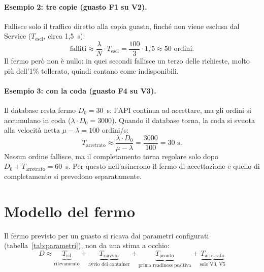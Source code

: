 \paragraph{Esempio 2: tre copie (guasto F1 su V2).} Fallisce solo il traffico diretto alla copia guasta, finché non viene esclusa dal Service ($T_{\text{escl}}$, circa 1,5~s):
\[
\text{falliti} \approx \frac{\lambda}{N} \cdot T_{\text{escl}} = \frac{100}{3} \cdot 1{,}5 \approx 50 \text{ ordini.}
\]
Il fermo però non è nullo: in quei secondi fallisce un terzo delle richieste, molto più dell'1\% tollerato, quindi contano come indisponibili.

\paragraph{Esempio 3: con la coda (guasto F4 su V3).} Il database resta fermo $D_0 = 30$~s: l'API continua ad accettare, ma gli ordini si accumulano in coda ($\lambda \cdot D_0 = 3000$). Quando il database torna, la coda si svuota alla velocità netta $\mu - \lambda = 100$ ordini/s:
\[
T_{\text{arretrato}} \approx \frac{\lambda \cdot D_0}{\mu - \lambda} = \frac{3000}{100} = 30 \text{ s.}
\]
Nessun ordine fallisce, ma il completamento torna regolare solo dopo $D_0 + T_{\text{arretrato}} = 60$~s. Per questo nell'asincrono il fermo di accettazione e quello di completamento si prevedono separatamente.

\section{Modello del fermo}

Il fermo previsto per un guasto si ricava dai parametri configurati (tabella~\ref{tab:parametri}), non da una stima a occhio:
\begin{equation}
  D \approx \underbrace{T_{\text{ril}}}_{\text{rilevamento}} + \underbrace{T_{\text{riavvio}}}_{\text{avvio del container}} + \underbrace{T_{\text{pronto}}}_{\text{prima readiness positiva}} + \underbrace{T_{\text{arretrato}}}_{\text{solo V3, V5}}
  \label{eq:fermo}
\end{equation}

